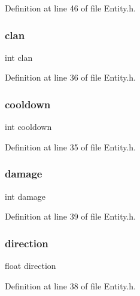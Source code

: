 Definition at line 46 of file Entity.\+h.

\mbox{\label{structentity_af3f30fa8b50e44df12b56cd7b0033da0}} 
\subsubsection{\texorpdfstring{clan}{clan}}
{\footnotesize\ttfamily int clan}



Definition at line 36 of file Entity.\+h.

\mbox{\label{structentity_af6120b55f42d5cb6044788bba68b9521}} 
\subsubsection{\texorpdfstring{cooldown}{cooldown}}
{\footnotesize\ttfamily int cooldown}



Definition at line 35 of file Entity.\+h.

\mbox{\label{structentity_a9b39867abc3f09243fcdc739bd9e6c90}} 
\subsubsection{\texorpdfstring{damage}{damage}}
{\footnotesize\ttfamily int damage}



Definition at line 39 of file Entity.\+h.

\mbox{\label{structentity_a8f54e9f41016004732115c10e844deb8}} 
\subsubsection{\texorpdfstring{direction}{direction}}
{\footnotesize\ttfamily float direction}



Definition at line 38 of file Entity.\+h.

\mbox{\label{structentity_adf58bef654884ab6c521153b0f99a82e}} 
